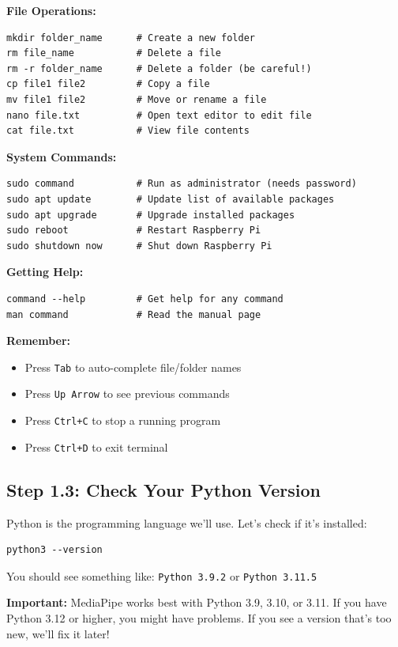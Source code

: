 \documentclass[12pt,a4paper]{article}
\begin{document}
\textbf{File Operations:}
\begin{lstlisting}
mkdir folder_name      # Create a new folder
rm file_name           # Delete a file
rm -r folder_name      # Delete a folder (be careful!)
cp file1 file2         # Copy a file
mv file1 file2         # Move or rename a file
nano file.txt          # Open text editor to edit file
cat file.txt           # View file contents
\end{lstlisting}

\textbf{System Commands:}
\begin{lstlisting}
sudo command           # Run as administrator (needs password)
sudo apt update        # Update list of available packages
sudo apt upgrade       # Upgrade installed packages
sudo reboot            # Restart Raspberry Pi
sudo shutdown now      # Shut down Raspberry Pi
\end{lstlisting}

\textbf{Getting Help:}
\begin{lstlisting}
command --help         # Get help for any command
man command            # Read the manual page
\end{lstlisting}

\begin{tipbox}
\textbf{Remember:}
\begin{itemize}
    \item Press \texttt{Tab} to auto-complete file/folder names
    \item Press \texttt{Up Arrow} to see previous commands
    \item Press \texttt{Ctrl+C} to stop a running program
    \item Press \texttt{Ctrl+D} to exit terminal
\end{itemize}
\end{tipbox}

\subsection{Step 1.3: Check Your Python Version}

Python is the programming language we'll use. Let's check if it's installed:

\begin{lstlisting}
python3 --version
\end{lstlisting}

You should see something like: \texttt{Python 3.9.2} or \texttt{Python 3.11.5}

\begin{warningbox}
\textbf{Important:} MediaPipe works best with Python 3.9, 3.10, or 3.11. If you have Python 3.12 or higher, you might have problems. If you see a version that's too new, we'll fix it later!
\end{warningbox}
\end{document}
